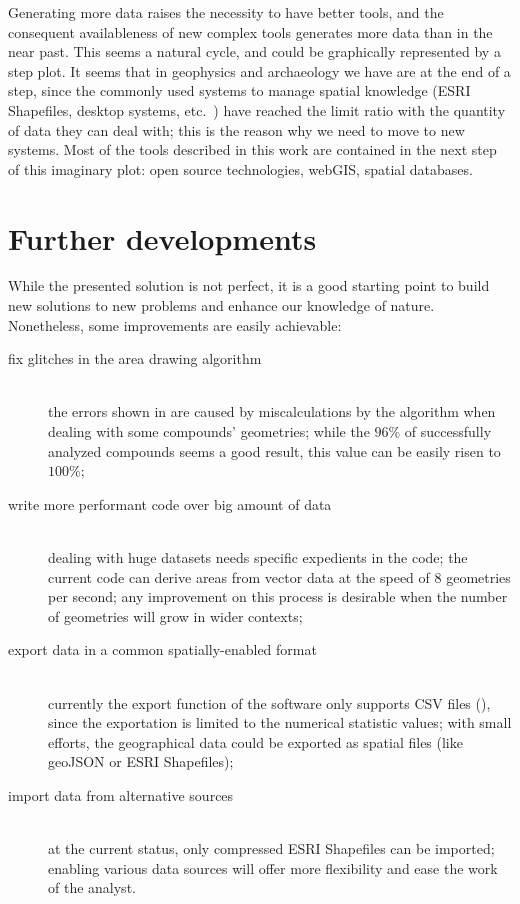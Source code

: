         Generating more data raises the necessity to have better tools, and the consequent availableness of new complex tools generates more data than in the near past. This seems a natural cycle, and could be graphically represented by a step plot. It seems that in geophysics and archaeology we have are at the end of a step, since the commonly used systems to manage spatial knowledge (ESRI Shapefiles, desktop systems, etc.\ ) have reached the limit ratio with the quantity of data they can deal with; this is the reason why we need to move to new systems. Most of the tools described in this work are contained in the next step of this imaginary plot: open source technologies, webGIS, spatial databases.

    \section{Further developments}
        While the presented solution is not perfect, it is a good starting point to build new solutions to new problems and enhance our knowledge of nature. Nonetheless, some improvements are easily achievable:

        \begin{description}
            \item[fix glitches in the area drawing algorithm]\hfill\\the errors shown in  are caused by miscalculations by the algorithm when dealing with some compounds' geometries; while the $96\%$ of successfully analyzed compounds seems a good result, this value can be easily risen to $100\%$;
            \item[write more performant code over big amount of data]\hfill\\dealing with huge datasets needs specific expedients in the code; the current code can derive areas from vector data at the speed of 8 geometries per second; any improvement on this process is desirable when the number of geometries will grow in wider contexts;
            \item[export data in a common spatially-enabled format]\hfill\\currently the export function of the software only supports CSV files (), since the exportation is limited to the numerical statistic values; with small efforts, the geographical data could be exported as spatial files (like geoJSON or ESRI Shapefiles);
            \item[import data from alternative sources]\hfill\\at the current status, only compressed ESRI Shapefiles can be imported; enabling various data sources will offer more flexibility and ease the work of the analyst.
        \end{description}
